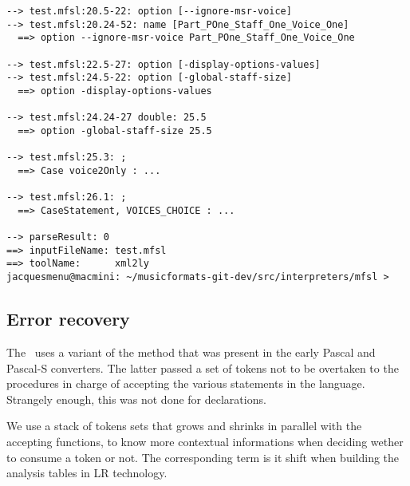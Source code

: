 \begin{lstlisting}[language=Terminal]
--> test.mfsl:20.5-22: option [--ignore-msr-voice]
--> test.mfsl:20.24-52: name [Part_POne_Staff_One_Voice_One]
  ==> option --ignore-msr-voice Part_POne_Staff_One_Voice_One

--> test.mfsl:22.5-27: option [-display-options-values]
--> test.mfsl:24.5-22: option [-global-staff-size]
  ==> option -display-options-values

--> test.mfsl:24.24-27 double: 25.5
  ==> option -global-staff-size 25.5

--> test.mfsl:25.3: ;
  ==> Case voice2Only : ...

--> test.mfsl:26.1: ;
  ==> CaseStatement, VOICES_CHOICE : ...

--> parseResult: 0
==> inputFileName: test.mfsl
==> toolName:      xml2ly
jacquesmenu@macmini: ~/musicformats-git-dev/src/interpreters/mfsl >
\end{lstlisting}


\subsection{Error recovery}

The \mfslLangInterp\ uses a variant of the  method that was present in the early Pascal and Pascal-S converters. The latter passed a set of tokens not to be overtaken to the procedures in charge of accepting the various statements in the language. Strangely enough, this was not done for declarations.

We use a stack of tokens sets that grows and shrinks in parallel with the accepting functions, to know more contextual informations when deciding wether to consume a token or not. The corresponding term is {it shift}
when building the analysis tables in LR technology.



